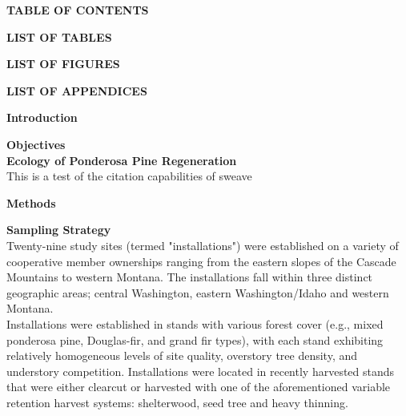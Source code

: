 \documentclass[10pt, letterpaper, fleqn]{article}
\begin{document}
\newpage
\large 
\begin{center}
\textbf{TABLE OF CONTENTS}\\[1pt]
\end{center}
\normalsize

\newpage
\large 
\begin{center}
\textbf{LIST OF TABLES}\\[1pt]
\end{center}
\normalsize

\newpage
\large 
\begin{center}
\textbf{LIST OF FIGURES}\\[1pt]
\end{center}
\normalsize

\newpage
\large 
\begin{center}
\textbf{LIST OF APPENDICES}\\[1pt]
\end{center}
\normalsize

\newpage
\large 
\begin{center}
\textbf{Introduction}\\[1pt]
\end{center}
\normalsize
\noindent 
{}
\textbf{Objectives}\\[1pt]
\textbf{Ecology of Ponderosa Pine Regeneration}\\[1pt]
This is a test of the citation capabilities of sweave\cite{Riegel1995a}

\newpage
\large 
\begin{center}
\textbf{Methods}\\[1pt]
\end{center}
\normalsize
\textbf{Sampling Strategy}\\[1pt]
\doublespacing
Twenty-nine study sites (termed "installations") were established on a variety of cooperative member ownerships ranging from the eastern slopes of the Cascade Mountains to western Montana. The installations fall within three distinct geographic areas; central Washington, eastern Washington/Idaho and western Montana. \\[4pt]

Installations were established in stands with various forest cover (e.g., mixed ponderosa pine, Douglas-fir, and grand fir types), with each stand exhibiting relatively homogeneous levels of site quality, overstory tree density, and understory competition.  Installations were located in recently harvested stands that were either clearcut or harvested with one of the aforementioned variable retention harvest systems: shelterwood, seed tree and heavy thinning. \\[2pt]
\end{document}
